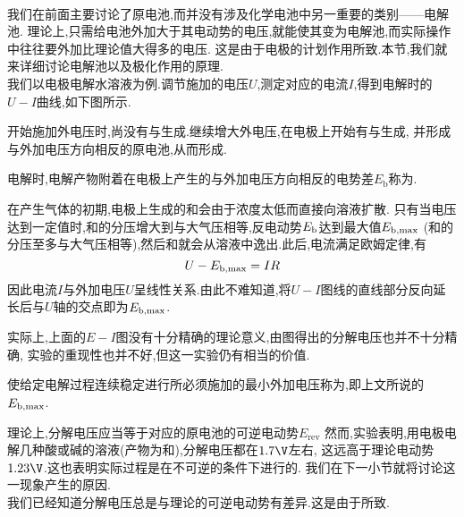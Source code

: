 \documentclass{ctexart}
\begin{document}
\pagestyle{plain}
\noindent{}\vspace{15pt}\\
\indent 我们在前面主要讨论了原电池,而并没有涉及化学电池中另一重要的类别——电解池.%
理论上,只需给电池外加大于其电动势的电压,就能使其变为电解池,而实际操作中往往要外加比理论值大得多的电压.%
这是由于电极的计划作用所致.本节,我们就来详细讨论电解池以及极化作用的原理.\vspace{12pt}\\
\indent 我们以电极电解水溶液为例.调节施加的电压$U$,测定对应的电流$I$,得到电解时的$U-I$曲线,如下图所示.
\begin{figure}[H]
    \centering
\end{figure}
开始施加外电压时,尚没有与生成.继续增大外电压,在电极上开始有与生成,%
并形成与外加电压方向相反的原电池,从而形成.
\begin{definition}[6E.1.1 反电动势]
    电解时,电解产物附着在电极上产生的与外加电压方向相反的电势差$E_\text{b}$称为.
\end{definition}
在产生气体的初期,电极上生成的和会由于浓度太低而直接向溶液扩散.%
只有当电压达到一定值时,和的分压增大到与大气压相等,反电动势$E_{\text b}$达到最大值$E_{\text b,\max}$%
(和的分压至多与大气压相等),然后和就会从溶液中逸出.此后,电流满足欧姆定律,有
\[U-E_{\text b,\max}=IR\]
因此电流$I$与外加电压$U$呈线性关系.由此不难知道,将$U-I$图线的直线部分反向延长后与$U$轴的交点即为$E_{\text b,\max}$.
\begin{hint}
    实际上,上面的$E-I$图没有十分精确的理论意义,由图得出的分解电压也并不十分精确,%
    实验的重现性也并不好,但这一实验仍有相当的价值.
\end{hint}
\begin{definition}[6E.1.2 分解电压]
    使给定电解过程连续稳定进行所必须施加的最小外加电压称为,即上文所说的$E_{\text b,\max}$.
\end{definition}
理论上,分解电压应当等于对应的原电池的可逆电动势$E_{\text{rev}}$%
然而,实验表明,用电极电解几种酸或碱的溶液(产物为和),分解电压都在$1.7\V$左右,%
这远高于理论电动势$1.23\V$.这也表明实际过程是在不可逆的条件下进行的.%
我们在下一小节就将讨论这一现象产生的原因.\vspace{4pt}\\
\indent 我们已经知道分解电压总是与理论的可逆电动势有差异.这是由于所致.
\end{document}
